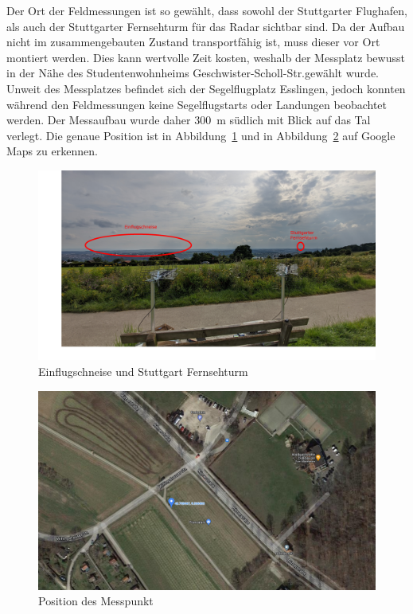 Der Ort der Feldmessungen ist so gewählt, dass sowohl der Stuttgarter Flughafen, als auch der Stuttgarter Fernsehturm für das Radar sichtbar sind. Da der Aufbau nicht im zusammengebauten Zustand transportfähig ist, muss dieser vor Ort montiert werden. Dies kann wertvolle Zeit kosten, weshalb der Messplatz bewusst in der Nähe des Studentenwohnheims Geschwister-Scholl-Str.\@ gewählt wurde. Unweit des Messplatzes befindet sich der Segelflugplatz Esslingen, jedoch konnten während den Feldmessungen keine Segelflugstarts oder Landungen beobachtet werden. Der Messaufbau wurde daher \SI{300}{\metre} südlich mit Blick auf das Tal verlegt. Die genaue Position ist in Abbildung~\ref{fig:Einflugschneise} und in Abbildung~\ref{fig:Maps} auf Google Maps zu erkennen.

\begin{figure}
    \centering
    \includegraphics[width=\textwidth]{images/Einflugschneise.jpg}
    \caption{Einflugschneise und Stuttgart Fernsehturm}\label{fig:Einflugschneise}
\end{figure}

\begin{figure}
    \centering
    \includegraphics[width=\textwidth]{images/Maps_Messpunkt.png}
    \caption{Position des Messpunkt}\label{fig:Maps}
\end{figure}

